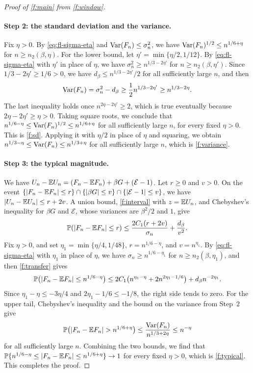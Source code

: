 \begin{proof}[Proof of \cref{f:main} from \cref{f:window}]
\paragraph{Step 2: the standard deviation and the variance.} Fix $\eta>0$. By \eqref{eq:fl-sigma-eta} and $\operatorname{Var}(F_n)\le\sigma_n^2$, we have $\operatorname{Var}(F_n)^{1/2}\le n^{1/6+\eta}$ for $n\ge n_2(\beta,\eta)$. For the lower bound, let $\eta'=\min\{\eta/2,1/12\}$. By \eqref{eq:fl-sigma-eta} with $\eta'$ in place of $\eta$, we have $\sigma_n^2\ge n^{1/3-2\eta'}$ for $n\ge n_2(\beta,\eta')$. Since $1/3-2\eta'\ge1/6>0$, we have $d_\beta\le n^{1/3-2\eta'}/2$ for all sufficiently large $n$, and then
\[
 \operatorname{Var}(F_n)=\sigma_n^2-d_\beta\ge\frac12n^{1/3-2\eta'}\ge n^{1/3-2\eta}.
\]
The last inequality holds once $n^{2\eta-2\eta'}\ge2$, which is true eventually because $2\eta-2\eta'\ge\eta>0$. Taking square roots, we conclude that $n^{1/6-\eta}\le\operatorname{Var}(F_n)^{1/2}\le n^{1/6+\eta}$ for all sufficiently large $n$, for every fixed $\eta>0$. This is \eqref{f:sd}. Applying it with $\eta/2$ in place of $\eta$ and squaring, we obtain $n^{1/3-\eta}\le\operatorname{Var}(F_n)\le n^{1/3+\eta}$ for all sufficiently large $n$, which is \eqref{f:variance}.

\paragraph{Step 3: the typical magnitude.} We have $U_n-\mathbb E U_n=(F_n-\mathbb E F_n)+\beta G+(\mathcal E-1)$. Let $r\ge0$ and $v>0$. On the event $\{|F_n-\mathbb E F_n|\le r\}\cap\{|\beta G|\le v\}\cap\{|\mathcal E-1|\le v\}$, we have $|U_n-\mathbb E U_n|\le r+2v$. A union bound, \eqref{f:interval} with $z=\mathbb E U_n$, and Chebyshev's inequality for $\beta G$ and $\mathcal E$, whose variances are $\beta^2/2$ and $1$, give
\begin{equation}\label{f:transfer}
 \mathbb P(|F_n-\mathbb E F_n|\le r)\le\frac{2C_1(r+2v)}{\sigma_n}+\frac{d_\beta}{v^2}.
\end{equation}
Fix $\eta>0$, and set $\eta_1=\min\{\eta/4,1/48\}$, $r=n^{1/6-\eta}$, and $v=n^{\eta_1}$. By \eqref{eq:fl-sigma-eta} with $\eta_1$ in place of $\eta$, we have $\sigma_n\ge n^{1/6-\eta_1}$ for $n\ge n_2(\beta,\eta_1)$, and then \eqref{f:transfer} gives
\[
 \mathbb P\bigl(|F_n-\mathbb E F_n|\le n^{1/6-\eta}\bigr)\le2C_1\bigl(n^{\eta_1-\eta}+2n^{2\eta_1-1/6}\bigr)+d_\beta n^{-2\eta_1}.
\]
Since $\eta_1-\eta\le-3\eta/4$ and $2\eta_1-1/6\le-1/8$, the right side tends to zero. For the upper tail, Chebyshev's inequality and the bound on the variance from Step~2 give
\[
 \PP\bigl(|F_n-\E F_n|>n^{1/6+\eta}\bigr)\le\frac{\Var(F_n)}{n^{1/3+2\eta}}\le n^{-\eta}
\]
for all sufficiently large $n$. Combining the two bounds, we find that $\mathbb P\{n^{1/6-\eta}\le|F_n-\mathbb E F_n|\le n^{1/6+\eta}\}\to1$ for every fixed $\eta>0$, which is \eqref{f:typical}. This completes the proof.
\end{proof}
